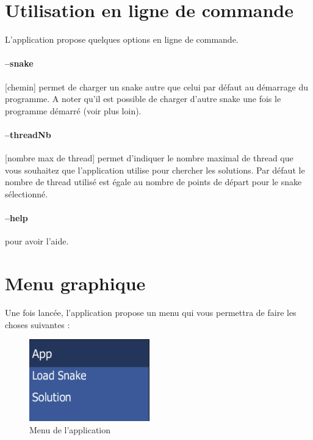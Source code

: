 \section*{Utilisation en ligne de commande}
L'application propose quelques options en ligne de commande.

\paragraph{--snake} [chemin] permet de charger un snake autre que celui par défaut au démarrage du programme. A noter qu'il est possible de charger d'autre snake une fois le programme démarré (voir plus loin).

\paragraph{--threadNb} [nombre max de thread] permet d'indiquer le nombre maximal de thread que vous souhaitez que l'application utilise pour chercher les solutions. Par défaut le nombre de thread utilisé est égale au nombre de points de départ pour le snake sélectionné.

\paragraph{--help} pour avoir l'aide.

\section*{Menu graphique}
Une fois lancée, l'application propose un menu qui vous permettra de faire les choses suivantes :

\begin{figure}[h]
 \centering
 \includegraphics[scale=0.7,keepaspectratio=true]{img/menu1.png}
 \caption{Menu de l'application}
\end{figure}